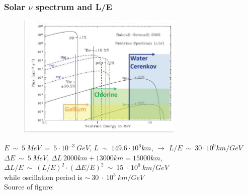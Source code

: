 \begin{frame}\frametitle{Solar $\nu$ spectrum and L/E}
\begin{figure}
\centering
\includegraphics[width=0.70\textwidth, keepaspectratio=true]{figs/solarNeutrinoSpectrum.png}
\end{figure}
\scriptsize
$E~\sim~5~MeV~=~5\cdot10^{-3}~GeV$, $L~\sim~149.6 \cdot 10^6 km$, $\rightarrow$ $L/E~\sim~30\cdot 10^9 km/GeV$\\
$\Delta{E}~\sim~5~MeV$, $\Delta{L}~2000km+13000km=15000km$, $\Delta{L/E}~\sim~(L/E)^2 \cdot (\Delta{E}/E)^2~\sim~15~\cdot~10^9~km/GeV$\\
while oscillation period is $\sim~30~\cdot~10^3~km/GeV$\\
\tiny
Source of figure: \cite{ref_fig_solarNeutrinoSpectrum}
\end{frame}

